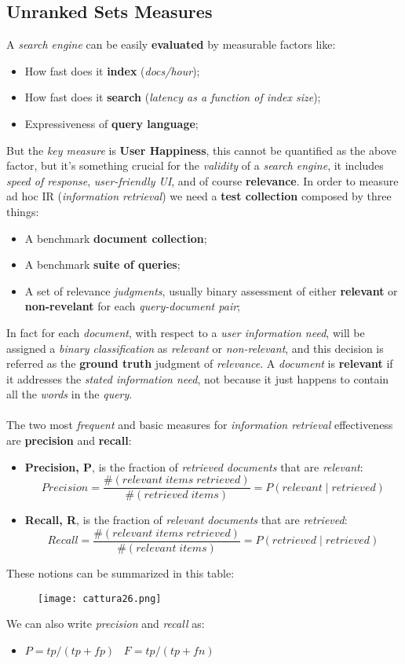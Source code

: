 \documentclass{article}
\begin{document}
\subsection{Unranked Sets Measures}
A \emph{search engine} can be easily \textbf{evaluated} by measurable factors like:
\begin{itemize}
\item How fast does it \textbf{index} (\emph{docs/hour});
\item How fast does it \textbf{search} (\emph{latency as a function of index size});
\item Expressiveness of \textbf{query language};
\end{itemize}
But the \emph{key measure} is \textbf{User Happiness}, this cannot be quantified as the above factor, but it's something crucial for the \emph{validity} of a \emph{search engine}, it includes \emph{speed of response}, \emph{user-friendly UI}, and of course \textbf{relevance}. In order to measure ad hoc IR (\emph{information retrieval}) we need a \textbf{test collection} composed by three things:
\begin{itemize}
\item A benchmark \textbf{document collection};
\item A benchmark \textbf{suite of queries};
\item A set of relevance \emph{judgments}, usually binary assessment of either \textbf{relevant} or \textbf{non-revelant} for each \emph{query-document pair};
\end{itemize}
In fact for each \emph{document}, with respect to a \emph{user information need}, will be assigned a \emph{binary classification} as \emph{relevant} or \emph{non-relevant}, and this decision is referred as the \textbf{ground truth} judgment of \emph{relevance}. A \emph{document} is \textbf{relevant} if it addresses the \emph{stated information need}, not because it just happens to contain all the \emph{words} in the \emph{query}. \\\\
The two most \emph{frequent} and basic measures for \emph{information retrieval} effectiveness are \textbf{precision} and \textbf{recall}:
\begin{itemize}
\item \textbf{Precision, P}, is the fraction of \emph{retrieved documents} that are \emph{relevant}:
\[ Precision = \frac{\#(relevant\; items\; retrieved)}{\#(retrieved\; items)} = P(relevant\;|\;retrieved)\]
\item \textbf{Recall, R}, is the fraction of \emph{relevant documents} that are \emph{retrieved}:
\[ Recall = \frac{\#(relevant\; items\; retrieved)}{\#(relevant\; items)} = P(retrieved\;|\;retrieved)\]
\end{itemize}
These notions can be summarized in this table:
\begin{figure}[H]
  \centering
  \texttt{[image: cattura26.png]}
\end{figure}
We can also write \emph{precision} and \emph{recall} as:
\begin{itemize}
\item $ P = tp/(tp+fp)\;\;\; F = tp/(tp+fn)$
\end{itemize}
\end{document}
